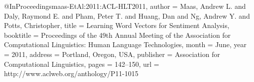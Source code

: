 


@InProceedings{maas-EtAl:2011:ACL-HLT2011,
  author    = {Maas, Andrew L.  and  Daly, Raymond E.  and  Pham, Peter T.  and  Huang, Dan  and  Ng, Andrew Y.  and  Potts, Christopher},
  title     = {Learning Word Vectors for Sentiment Analysis},
  booktitle = {Proceedings of the 49th Annual Meeting of the Association for Computational Linguistics: Human Language Technologies},
  month     = {June},
  year      = {2011},
  address   = {Portland, Oregon, USA},
  publisher = {Association for Computational Linguistics},
  pages     = {142--150},
  url       = {http://www.aclweb.org/anthology/P11-1015}
}
